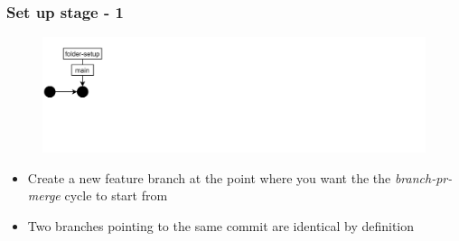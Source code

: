 \documentclass[aspectratio=169]{beamer} %
\begin{document}
\begin{frame}
	\frametitle{Set up stage - 1}
	
	\vspace{-.5cm}
	\begin{minipage}[t][5cm][t]{\textwidth}
		\begin{figure}
			\centering
			\includegraphics[width=\textwidth]{./img/dime-gitflow-network-1-0.png}
		\end{figure}
	\end{minipage}  
	
	\vspace{-.5cm}
	\begin{minipage}[t][5cm][t]{\textwidth}
		\begin{itemize}
			\setlength\itemsep{.5em}
			\item Create a new feature branch at the point where you want the the \textit{branch-pr-merge} cycle to start from
			\item Two branches pointing to the same commit are identical by definition
		\end{itemize}
	\end{minipage}  
	
\end{frame}
\end{document}
